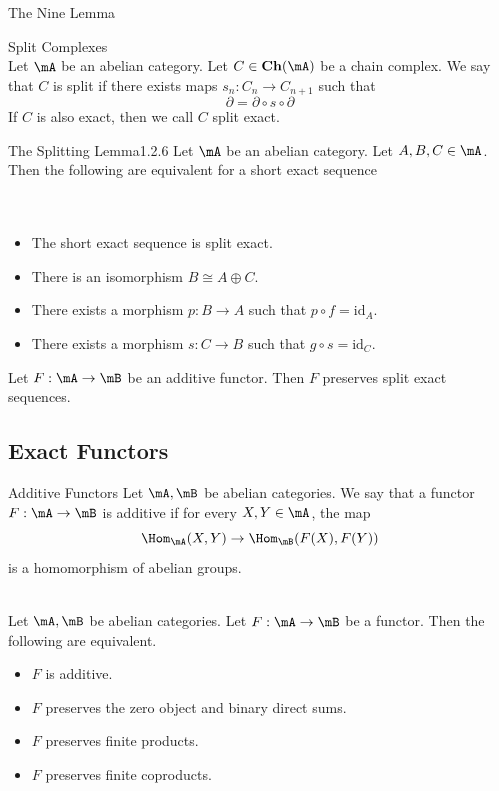 \documentclass[a4paper]{article}
\begin{document}
\begin{thm}{The Nine Lemma}{}\\
\end{thm}

\begin{defn}{Split Complexes}{}\\
Let $\mA$ be an abelian category. Let $C\in\bold{Ch}(\mA)$ be a chain complex. We say that $C$ is split if there exists maps $s_n:C_n\to C_{n+1}$ such that $$\partial=\partial\circ s\circ\partial$$ If $C$ is also exact, then we call $C$ split exact. 
\end{defn}

\begin{thm}{The Splitting Lemma}{1.2.6} Let $\mA$ be an abelian category. Let $A,B,C\in\mA$. Then the following are equivalent for a short exact sequence \\~\\
\\
\begin{itemize}
\item The short exact sequence is split exact. 
\item There is an isomorphism $B\cong A\oplus C$. 
\item There exists a morphism $p:B\to A$ such that $p\circ f=\text{id}_A$. 
\item There exists a morphism $s:C\to B$ such that $g\circ s=\text{id}_C$. 
\end{itemize} 
\end{thm}

\begin{prp}{}{} Let $F:\mA\to\mB$ be an additive functor. Then $F$ preserves split exact sequences. 
\end{prp}

\subsection{Exact Functors}
\begin{defn}{Additive Functors}{} Let $\mA,\mB$ be abelian categories. We say that a functor $F:\mA\to\mB$ is additive if for every $X,Y\in\mA$, the map $$\Hom_\mA(X,Y)\to\Hom_\mB(F(X),F(Y))$$ is a homomorphism of abelian groups. 
\end{defn}

\begin{prp}{}{}\\
Let $\mA,\mB$ be abelian categories. Let $F:\mA\to\mB$ be a functor. Then the following are equivalent. 
\begin{itemize}
\item $F$ is additive. 
\item $F$ preserves the zero object and binary direct sums. 
\item $F$ preserves finite products. 
\item $F$ preserves finite coproducts. 
\end{itemize}
\end{prp}
\end{document}
